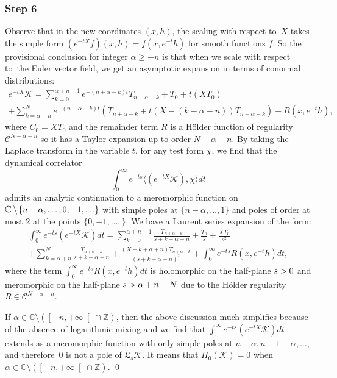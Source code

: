\documentclass[JEP,XML,SOM,Unicode]{cedram}
\let\pazocal\mathscr
\theoremstyle{definition}
\let\cv\alpha
\let\euler X
\let\Re\relax
\DeclareMathOperator{\Re}{Re}
\newcommand{\clopen}[1]{\mathopen{}\mathclose{\left[#1 \right[}}
\newcommand{\step}[1]{\subsubsection*{Step #1}}
\begin{document}
\step{6} Observe that in the new coordinates $(x,h)$,
the scaling with respect to~$\euler$ takes the simple form
$ {\left(e^{-t\euler}f\right)} (x,h) = f(x,e^{-t} h)$ for smooth functions $f$.
So the provisional conclusion for integer $\cv\geqslant -n$ is that when we scale with respect to~the Euler vector field, we get an asymptotic expansion
in terms of conormal distributions:
\begin{multline*}
e^{-t\euler}\pazocal{K}=\sum_{k=0}^{\cv+n-1} {e^{-(n+\cv-k)t}} T_{n+\cv-k}+T_0+t\left(\euler T_0\right) \\
+\sum_{k=\cv+n }^N
{e^{-(n+\cv-k)t}} \left(T_{n+\cv-k}+t (\euler -(k-\cv-n)) T_{n+\cv-k} \right) + R(x,e^{-t}h),
\end{multline*}
where $C_0=\euler T_0$ and the remainder term $R$ is a Hölder function of regularity $\pazocal{C}^{N-\cv-n}$ so it has a Taylor expansion up to order $N-\cv-n$.
By taking the Laplace transform in the variable $t$, for any test form $\chi$, we find that the dynamical correlator
\[
\int_0^\infty e^{-ts}\langle {(e^{-t\euler} \pazocal{K})},\chi\rangle dt
\]
admits an analytic continuation
to a meromorphic function on $\mathbb{C}\setminus\mkern-2mu \{n-\cv,\dots ,0 ,-1,\dots\mkern-1mu\}$
with simple poles at $\{n-\cv,\dots ,1 \}$ and poles of order at most $2$
at the points $\{0,-1,\dots, \}$.
We have a Laurent series expansion of the form:
\begin{multline*}
\int_0^\infty e^{-ts} {(e^{-t\euler} \pazocal{K})} dt=\sum_{k=0}^{\cv+n-1} \frac{T_{n+\cv-k}}{s+k-\cv-n}+ \frac{T_0}{s}+\frac{\euler T_0}{s^2}
\\
+\sum_{k=\cv+n }^N \frac{T_{n+\cv-k}}{s+k-\cv-n}+ \frac{(\euler-k+\cv+n)T_{n+\cv-k}}{(s+k-\cv-n)^2 } + \int_0^\infty e^{-ts} R(x,e^{-t}h) dt,
\end{multline*}
where the term $\int_0^\infty e^{-ts} R(x,e^{-t}h)dt$ is holomorphic on the half-plane $\Re s >0$ and meromorphic
on the half-plane $\Re s > \cv+n-N$ due to the Hölder regularity $R\in \pazocal{C}^{N-\cv-n}$.

If $\cv\in\mathbb{C}\setminus(\clopen{-n,+\infty}\cap \mathbb{Z})$, then the above discussion much simplifies because of the absence of logarithmic mixing and we find that $\int_0^\infty e^{-ts} \left(e^{-t\euler}\pazocal{K}\right) dt$ extends as a meromorphic function with only simple poles at $n-\cv, n-1-\cv,\dots,$ and therefore~$0$ is not a pole of $\mathfrak{L}_s\pazocal{K}$. It means that $\Pi_0(\pazocal{K})=0$ when $\cv\in\mathbb{C}\setminus(\clopen{-n,+\infty}\cap \mathbb{Z})$.
\qed
\end{document}
